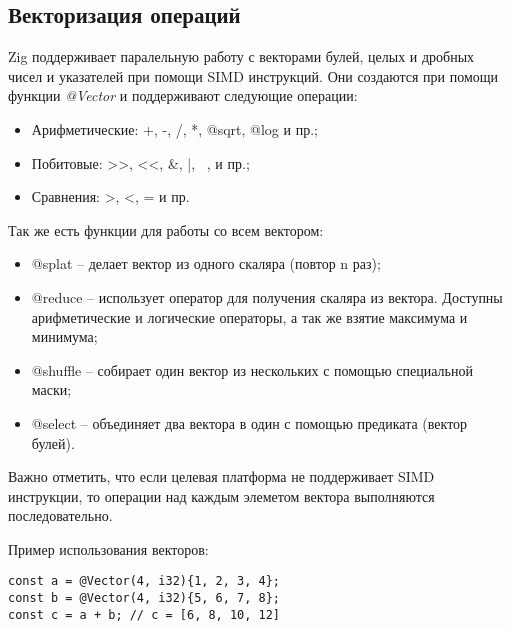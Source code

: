 \subsection{Векторизация операций}

Zig поддерживает паралельную работу с векторами булей, целых и дробных чисел и указателей при помощи SIMD инструкций.
Они создаются при помощи функции \textit{@Vector} и поддерживают следующие операции:
\begin{itemize}
    \item Арифметические: +, -, /, *, @sqrt, @log и пр.;
    \item Побитовые: >>, <<, \&, |, ~, и пр.;
    \item Сравнения: >, <, = и пр.
\end{itemize}

Так же есть функции для работы со всем вектором:
\begin{itemize}
    \item @splat -- делает вектор из одного скаляра (повтор n раз);
    \item @reduce -- использует оператор для получения скаляра из вектора. Доступны арифметические и логические операторы, а так же взятие максимума и минимума;
    \item @shuffle -- собирает один вектор из нескольких с помощью специальной маски;
    \item @select -- объединяет два вектора в один с помощью предиката (вектор булей).
\end{itemize}

Важно отметить, что если целевая платформа не поддерживает SIMD инструкции, то операции над каждым элеметом вектора выполняются последовательно.

Пример использования векторов:
\begin{lstlisting}
const a = @Vector(4, i32){1, 2, 3, 4};
const b = @Vector(4, i32){5, 6, 7, 8};
const c = a + b; // c = [6, 8, 10, 12]
\end{lstlisting}